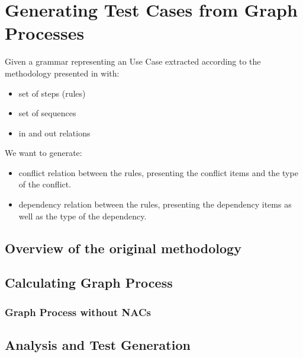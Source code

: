 \chapter{Generating Test Cases from Graph Processes}\label{ch:tests}

Given a grammar representing an Use Case extracted according to the methodology presented in \cite{Junior2015} with:

\begin{itemize}
\item set of steps (rules)
\item set of sequences
\item in and out relations
\end{itemize}

We want to generate:

\begin{itemize}
\item conflict relation between the rules, presenting the conflict items and the type of the conflict.
\item dependency relation between the rules, presenting the dependency items as well as the type of the dependency.
\end{itemize}

\section{Overview of the original methodology}

\section{Calculating Graph Process}

\subsection{Graph Process without NACs}

\begin{definition}
\end{definition}

\section{Analysis and Test Generation}





